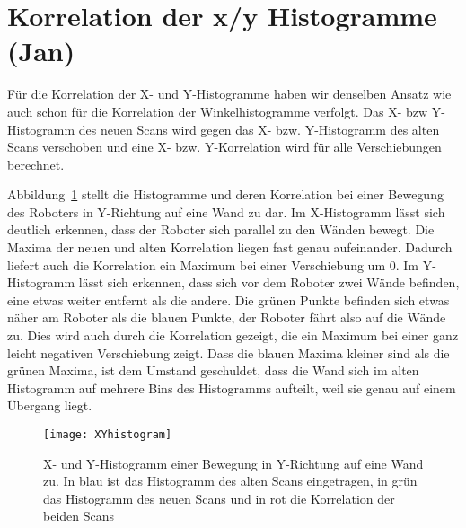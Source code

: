 \section{Korrelation der x/y Histogramme (Jan)}

Für die Korrelation der X- und Y-Histogramme haben wir denselben Ansatz wie auch schon für die Korrelation der Winkelhistogramme verfolgt. Das X- bzw Y-Histogramm des neuen Scans wird gegen das X- bzw. Y-Histogramm des alten Scans verschoben und eine X- bzw. Y-Korrelation wird für alle Verschiebungen berechnet.

Abbildung~\ref{fig:xyhistogram} stellt die Histogramme und deren Korrelation bei einer Bewegung des Roboters in Y-Richtung auf eine Wand zu dar. Im X-Histogramm lässt sich deutlich erkennen, dass der Roboter sich parallel zu den Wänden bewegt. Die Maxima der neuen und alten Korrelation liegen fast genau aufeinander. Dadurch liefert auch die Korrelation ein Maximum bei einer Verschiebung um 0. Im Y-Histogramm lässt sich erkennen, dass sich vor dem Roboter zwei Wände befinden, eine etwas weiter entfernt als die andere. Die grünen Punkte befinden sich etwas näher am Roboter als die blauen Punkte, der Roboter fährt also auf die Wände zu. Dies wird auch durch die Korrelation gezeigt, die ein Maximum bei einer ganz leicht negativen Verschiebung zeigt. Dass die blauen Maxima kleiner sind als die grünen Maxima, ist dem Umstand geschuldet, dass die Wand sich im alten Histogramm auf mehrere Bins des Histogramms aufteilt, weil sie genau auf einem Übergang liegt.


\begin{figure}
	\centering
	\texttt{[image: XYhistogram]}
	\caption{X- und Y-Histogramm einer Bewegung in Y-Richtung auf eine Wand zu. In blau ist das Histogramm des alten Scans eingetragen, in grün das Histogramm des neuen Scans und in rot die Korrelation der beiden Scans}
	\label{fig:xyhistogram}
\end{figure}